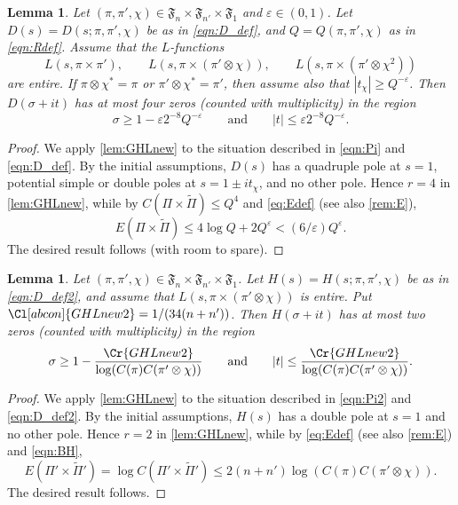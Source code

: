 \documentclass[12pt]{amsart}
\newtheorem{lemma}[theorem]{Lemma}
\theoremstyle{definition}
\theoremstyle{remark}
\numberwithin{equation}{section}
\theoremstyle{plain}
\renewcommand{\tilde}{\widetilde}
\renewcommand{\epsilon}{\varepsilon}
\begin{document}
\begin{lemma}
\label{lem:GHL}
Let $(\pi,\pi',\chi)\in\mathfrak{F}_n\times\mathfrak{F}_{n'}\times\mathfrak{F}_1$ and $\epsilon\in(0,1)$.  Let $D(s)=D(s;\pi,\pi',\chi)$ be as in \eqref{eqn:D_def}, and $Q=Q(\pi,\pi',\chi)$ as in \eqref{eqn:Rdef}.  Assume that the $L$-functions
\begin{equation}
\label{eqn:Lfns}
L(s,\pi\times\pi'),\qquad L(s,\pi\times(\pi'\otimes\chi)),\qquad L(s,\pi\times(\pi'\otimes\chi^2))
\end{equation}
are entire.  If $\pi\otimes\chi^*=\pi$ or $\pi'\otimes\chi^*=\pi'$, then assume also that $|t_{\chi}|\geq Q^{-\epsilon}$.  Then $D(\sigma+it)$ has at most four zeros (counted with multiplicity) in the region
\begin{equation}
\label{eqn:GHL_interval}
\sigma\geq 1-\epsilon 2^{-8}Q^{-\epsilon}
\qquad\text{and}\qquad
|t|\leq\epsilon 2^{-8}Q^{-\epsilon}.
\end{equation}
\end{lemma}
\begin{proof}
We apply \cref{lem:GHLnew} to the situation described in \eqref{eqn:Pi} and \eqref{eqn:D_def}. By the initial assumptions, $D(s)$ has a quadruple pole at $s=1$, potential simple or double poles at $s=1\pm it_\chi$, and no other pole. Hence $r=4$ in \cref{lem:GHLnew}, while by $C(\Pi\times\tilde{\Pi})\leq Q^4$ and \eqref{eq:Edef} (see also \cref{rem:E}),
\[
E(\Pi\times\tilde{\Pi})\leq 4\log Q+2Q^\epsilon<(6/\epsilon)Q^{\epsilon}.
\]
The desired result follows (with room to spare).
\end{proof}

\begin{lemma}
\label{lem:GHL2}
Let $(\pi,\pi',\chi)\in\mathfrak{F}_n\times\mathfrak{F}_{n'}\times\mathfrak{F}_1$. Let $H(s)=H(s;\pi,\pi',\chi)$ be as in \eqref{eqn:D_def2}, and assume that $L(s,\pi\times(\pi'\otimes\chi))$ is entire. Put $\Cl[abcon]{GHLnew2}=1/(34(n+n'))$. Then $H(\sigma+it)$ has at most two zeros (counted with multiplicity) in the region
\[
\sigma\geq 1-\frac{\Cr{GHLnew2}}{\log(C(\pi)C(\pi'\otimes\chi))}
\qquad\text{and}\qquad
|t|\leq\frac{\Cr{GHLnew2}}{\log(C(\pi)C(\pi'\otimes\chi))}.
\]
\end{lemma}
\begin{proof}
We apply \cref{lem:GHLnew} to the situation described in \eqref{eqn:Pi2} and \eqref{eqn:D_def2}. By the initial assumptions, $H(s)$ has a double pole at $s=1$ and no other pole. Hence $r=2$ in \cref{lem:GHLnew}, while by \eqref{eq:Edef} (see also \cref{rem:E}) and \eqref{eqn:BH},
\[
E(\Pi'\times\tilde{\Pi}')=\log C(\Pi'\times\tilde{\Pi}')\leq 2(n+n')\log(C(\pi)C(\pi'\otimes\chi)).
\]
The desired result follows.
\end{proof}
\end{document}
